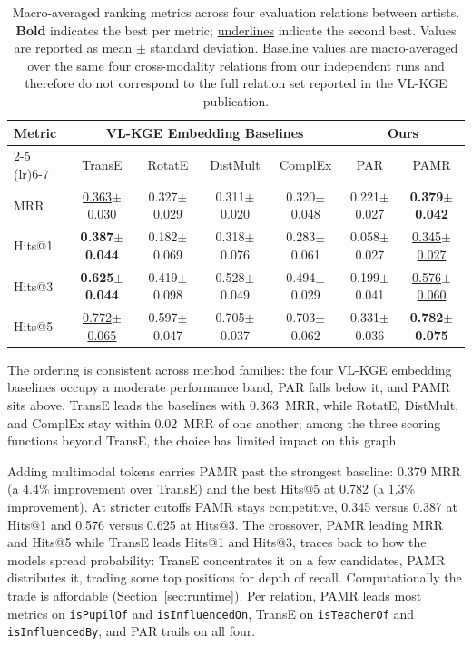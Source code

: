 \documentclass[runningheads]{llncs}
\begin{document}
\begin{table}[t]
  \centering
  \setlength{\tabcolsep}{2pt}
  \renewcommand{\arraystretch}{1.15}
  {\footnotesize
    \begin{tabular}{l|cccc|cc}
      \toprule
      \multirow{2}{*}{Metric} &
      \multicolumn{4}{|c|}{VL-KGE Embedding Baselines} &
      \multicolumn{2}{|c|}{Ours} \\
      \cmidrule(lr){2-5} \cmidrule(lr){6-7}
      & TransE & RotatE & DistMult & ComplEx & PAR & PAMR \\
      \midrule
      MRR  & \underline{0.363$\pm$0.030} & 0.327$\pm$0.029 & 0.311$\pm$0.020 & 0.320$\pm$0.048 & 0.221$\pm$0.027 & \textbf{0.379$\pm$0.042} \\
      Hits@1 & \textbf{0.387$\pm$0.044} & 0.182$\pm$0.069 & 0.318$\pm$0.076 & 0.283$\pm$0.061 & 0.058$\pm$0.027 & \underline{0.345$\pm$0.027} \\
      Hits@3 & \textbf{0.625$\pm$0.044} & 0.419$\pm$0.098 & 0.528$\pm$0.049 & 0.494$\pm$0.029 & 0.199$\pm$0.041 & \underline{0.576$\pm$0.060} \\
      Hits@5 & \underline{0.772$\pm$0.065} & 0.597$\pm$0.047 & 0.705$\pm$0.037 & 0.703$\pm$0.062 & 0.331$\pm$0.036 & \textbf{0.782$\pm$0.075} \\
      \bottomrule
  \end{tabular}}
  \caption{Macro-averaged ranking metrics across four evaluation
    relations between artists. \textbf{Bold} indicates the best per metric;
    \underline{underlines} indicate the second best. Values are reported
    as mean $\pm$ standard deviation. Baseline values are macro-averaged
    over the same four cross-modality relations from our independent runs
    and therefore do not correspond to the full relation set reported in
    the VL-KGE publication.}
  \label{tab:results}
\end{table}

The ordering is consistent across method families: the four VL-KGE
embedding baselines occupy a moderate performance band, PAR falls
below it, and PAMR sits above. TransE leads the baselines with
0.363~MRR, while RotatE, DistMult, and ComplEx stay within
0.02~MRR of one another; among the three scoring functions beyond
TransE, the choice has limited impact on this graph.

Adding multimodal tokens carries PAMR past the strongest baseline:
0.379 MRR (a 4.4\% improvement over TransE) and the best Hits@5 at
0.782 (a 1.3\% improvement). At stricter cutoffs PAMR stays
competitive, 0.345 versus 0.387 at Hits@1 and 0.576 versus 0.625 at
Hits@3. The crossover, PAMR leading MRR and Hits@5 while TransE
leads Hits@1 and Hits@3, traces back to how the models spread
probability: TransE concentrates it on a few candidates, PAMR
distributes it, trading some top positions for depth of recall.
Computationally the trade is affordable (Section~\ref{sec:runtime}).
Per relation, PAMR leads most metrics
on \texttt{isPupilOf} and \texttt{isInfluencedOn}, TransE on
\texttt{isTeacherOf} and \texttt{isInfluencedBy}, and PAR trails on
all four.
\end{document}

